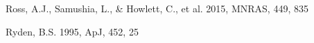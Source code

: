 \documentclass[iop]{emulateapj}
\begin{document}
\begin{thebibliography}{}

Ross, A.J., Samushia, L., \& Howlett, C., et al. 2015, MNRAS, 449, 835

Ryden, B.S. 1995, ApJ, 452, 25  



















\end{thebibliography}
\end{document}
